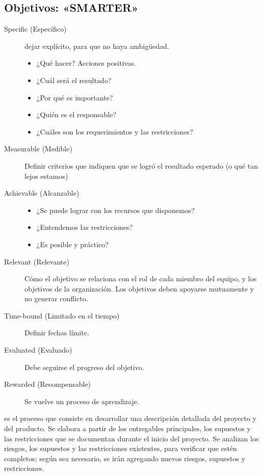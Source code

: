\documentclass[portrait,a0paper,fontscale=0.277]{baposter}
\newcommand{\compresslist}{%
\setlength{\topsep}{0pt}%
\setlength{\itemsep}{0pt}%
\setlength{\parskip}{0pt}%
\setlength{\parsep}{0pt}%
}
\begin{document}
\begin{poster}
{\begin{description}
\section*{Objetivos: «SMARTER»}
\begin{description}
	\item[Specific (Específico)] dejar explícito, para que no haya ambigüedad.
		\begin{itemize}\compresslist
			\item ¿Qué hacer? Acciones positivas.
			\item ¿Cuál será el resultado?
			\item ¿Por qué es importante?
			\item ¿Quién es el responsable?
			\item ¿Cuáles son los requerimientos y las restricciones?
		\end{itemize}
	\item[Measurable (Medible)]
	Definir criterios que indiquen que se logró el resultado esperado (o qué tan lejos estamos)
\item[Achievable (Alcanzable)]
	\begin{itemize}\compresslist
		\item ¿Se puede lograr con los recursos que disponemos?
		\item ¿Entendemos las restricciones?
		\item ¿Es posible y práctico?
	\end{itemize}
\item[Relevant (Relevante)]
	Cómo el objetivo se relaciona con el rol de cada miembro del equipo, y los objetivos de la organización.
	Los objetivos deben apoyarse mutuamente y no generar conflicto.
\item[Time-bound (Limitado en el tiempo)]
	Definir fechas límite.
\item[Evaluated (Evaluado)]
	Debe seguirse el progreso del objetivo.
\item[Rewarded (Recompensable)]
	Se vuelve un proceso de aprendizaje.
\end{description}
	
	
\item [Definir el Alcance] es el proceso que consiste en desarrollar una descripción detallada del
proyecto y del producto. Se elabora a partir de los entregables principales, los supuestos y
las restricciones que se documentan durante el inicio del proyecto. Se analizan los riesgos, los
supuestos y las restricciones existentes, para verificar que estén completos; según sea necesario,
se irán agregando nuevos riesgos, supuestos y restricciones. 


\end{description}}
\end{poster}
\end{document}
